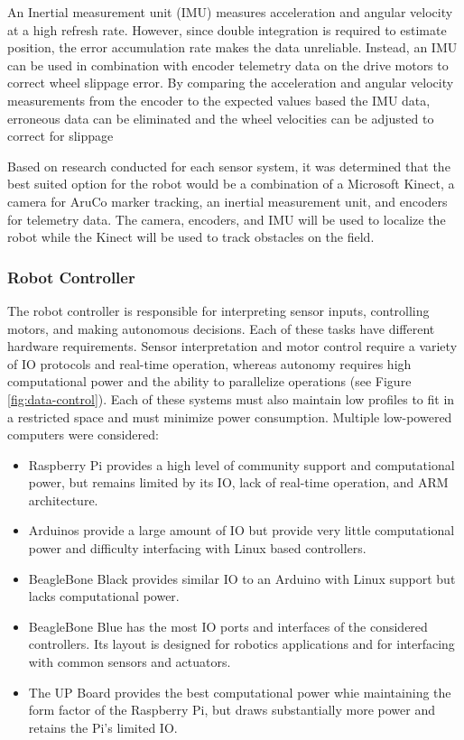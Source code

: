 \documentclass[class=article, crop=false]{standalone}
\begin{document}
	An Inertial measurement unit (IMU) measures acceleration and angular velocity at a high refresh rate. However, since double integration is required to estimate position, the error accumulation rate makes the data unreliable. Instead, an IMU can be used in combination with encoder telemetry data on the drive motors to correct wheel slippage error. By comparing the acceleration and angular velocity measurements from the encoder to the expected values based the IMU data, erroneous data can be eliminated and the wheel velocities can be adjusted to correct for slippage
	
	Based on research conducted for each sensor system, it was determined that the best suited option for the robot would be a combination of a Microsoft Kinect, a camera for AruCo marker tracking, an inertial measurement unit, and encoders for telemetry data. The camera, encoders, and IMU will be used to localize the robot while the Kinect will  be used to track obstacles on the field.
	
	\subsubsection{Robot Controller}
	
	The robot controller is responsible for interpreting sensor inputs, controlling motors, and making autonomous decisions. Each of these tasks have  different hardware requirements. Sensor interpretation and motor control require a variety of IO protocols and real-time operation, whereas autonomy requires high computational power and the ability to parallelize operations (see Figure \ref{fig:data-control}). Each of these systems must also maintain low profiles to fit in a restricted space and must minimize power consumption. Multiple low-powered computers were considered:
	\begin{itemize}
	 \item Raspberry Pi provides a high level of community support and computational power, but remains limited by its IO, lack of real-time operation, and ARM architecture.
	 \item Arduinos provide a large amount of IO but provide very little computational power and difficulty interfacing with Linux based controllers.
	 \item BeagleBone Black provides similar IO to an Arduino with Linux support but lacks computational power.
	 \item BeagleBone Blue has the most IO ports and interfaces of the considered controllers. Its layout is designed for robotics applications and for interfacing with common sensors and actuators. 
	 \item The UP Board provides the best computational power whie maintaining the form factor of the Raspberry Pi, but draws substantially more power and retains the Pi’s limited IO.
	\end{itemize}
	
\end{document}
